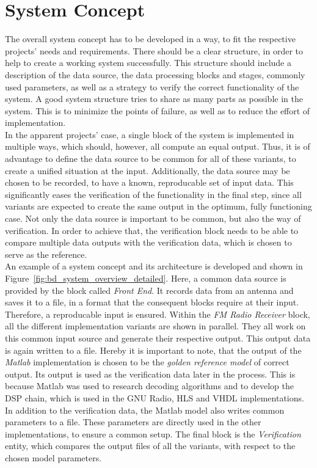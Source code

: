 \section{System Concept}

The overall system concept has to be developed in a way, to fit the respective projects' needs and requirements.
There should be a clear structure, in order to help to create a working system successfully.
This structure should include a description of the data source, the data processing blocks and stages, commonly used parameters, as well as a strategy to verify the correct functionality of the system.
A good system structure tries to share as many parts as possible in the system.
This is to minimize the points of failure, as well as to reduce the effort of implementation.\\

In the apparent projects' case, a single block of the system is implemented in multiple ways, which should, however, all compute an equal output.
Thus, it is of advantage to define the data source to be common for all of these variants, to create a unified situation at the input.
Additionally, the data source may be chosen to be recorded, to have a known, reproducable set of input data.
This significantly eases the verification of the functionality in the final step, since all variants are expected to create the same output in the optimum, fully functioning case.
Not only the data source is important to be common, but also the way of verification.
In order to achieve that, the verification block needs to be able to compare multiple data outputs with the verification data, which is chosen to serve as the reference.\\

An example of a system concept and its architecture is developed and shown in Figure~\ref{fig:bd_system_overview_detailed}.
Here, a common data source is provided by the block called \textit{Front End}.
It records data from an antenna and saves it to a file, in a format that the consequent blocks require at their input.
Therefore, a reproducable input is ensured.
Within the \textit{FM Radio Receiver} block, all the different implementation variants are shown in parallel.
They all work on this common input source and generate their respective output.
This output data is again written to a file.
Hereby it is important to note, that the output of the \textit{Matlab} implementation is chosen to be the \textit{golden reference model} of correct output.
Its output is used as the verification data later in the process.
This is because Matlab was used to research decoding algorithms and to develop the DSP chain, which is used in the GNU Radio, HLS and VHDL implementations.
In addition to the verification data, the Matlab model also writes common parameters to a file.
These parameters are directly used in the other implementations, to ensure a common setup.
The final block is the \textit{Verification} entity, which compares the output files of all the variants, with respect to the chosen model parameters.\\


